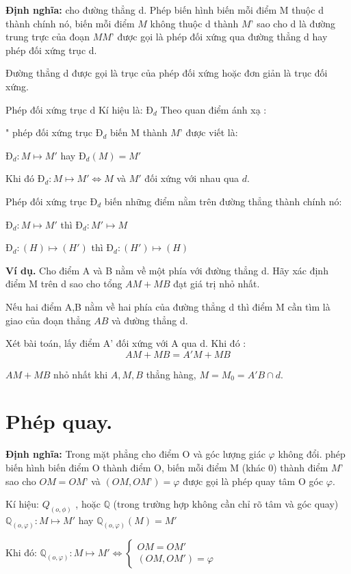 \documentclass[12pt,oneside,a4paper,reqno]{book}
\begin{document}
   \textbf{   Định nghĩa:} cho đường thẳng d. Phép biến hình biến mỗi điểm M thuộc d thành chính nó, biến mỗi điểm $M$ không thuộc d thành $M’$ sao cho d là đường trung trực của đoạn $MM’$ được gọi là phép đối xứng qua đường thẳng d hay phép đối xứng trục d.
   
Đường thẳng d được gọi là trục của phép đối xứng hoặc đơn giản là trục đối xứng.

 Phép đối xứng trục d Kí hiệu là: $\text{Đ}_d $
Theo quan điểm ánh xạ :

" phép đối xứng trục $\text{Đ}_d$  biến M thành $M’$ được viết là:

$\text{Đ}_d:M\mapsto M' $ hay $\text{Đ}_d(M)=M'$

Khi đó $\text{Đ}_d:M\mapsto M' \Leftrightarrow M$ và $M'$ đối xứng với nhau qua $d$.

Phép đối xứng trục $\text{Đ}_d$ biến những điểm nằm trên đường thẳng thành chính nó:

$\text{Đ}_d:M\mapsto M' $ thì $\text{Đ}_d:M'\mapsto M$

$\text{Đ}_d:(H)\mapsto (H') $ thì $\text{Đ}_d:(H')\mapsto (H)$

\textbf{Ví dụ.} Cho điểm A và B nằm về một phía với đường thẳng d. Hãy xác định điểm M trên d sao cho tổng $AM+MB$ đạt giá trị nhỏ nhất.

Nếu hai điểm A,B nằm về hai phía của đường thẳng d thì điểm M cần tìm là giao của đoạn thẳng $AB$ và đường thẳng d.

Xét bài toán,  lấy điểm A’ đối xứng với A qua d. Khi đó :
                    $$AM+MB=A'M+MB$$

 $AM+MB$ nhỏ nhất khi $A,M,B$ thẳng hàng, $M=M_0=A'B \cap d$.

\section{Phép quay.}

\textbf{Định nghĩa: }Trong mặt phẳng cho điểm O và góc lượng giác $\varphi$ không đổi.  phép biến hình biến điểm O thành điểm O, biến mỗi điểm M (khác 0) thành điểm $M’$ sao cho $OM=OM’$ và $(OM,OM’)=\varphi$ được gọi là phép quay tâm O góc $\varphi$.

Kí hiệu: $Q_{(o,\phi)}$ , hoặc $\mathbb{Q}$ (trong trường hợp không cần chỉ rõ tâm và góc quay)
$\mathbb{Q}_{(o,\varphi)}:M\mapsto M'$  hay $\mathbb{Q}_{(o,\varphi)}(M)=M'$

Khi đó: $\mathbb{Q}_{(o,\varphi)}: M\mapsto M' \Leftrightarrow \left\{\begin{matrix}
OM=OM'\\ 
(OM,OM')=\varphi
\end{matrix}\right.$
\end{document}

